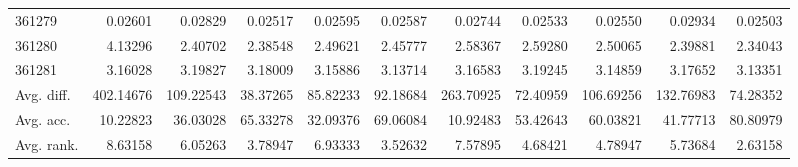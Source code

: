 \begin{tabular}{lrrrrrrrrrr}
361279 & 0.02601 & 0.02829 & 0.02517 & 0.02595 & 0.02587 & 0.02744 & 0.02533 & 0.02550 & 0.02934 & 0.02503 \\
361280 & 4.13296 & 2.40702 & 2.38548 & 2.49621 & 2.45777 & 2.58367 & 2.59280 & 2.50065 & 2.39881 & 2.34043 \\
361281 & 3.16028 & 3.19827 & 3.18009 & 3.15886 & 3.13714 & 3.16583 & 3.19245 & 3.14859 & 3.17652 & 3.13351 \\
Avg. diff. & 402.14676 & 109.22543 & 38.37265 & 85.82233 & 92.18684 & 263.70925 & 72.40959 & 106.69256 & 132.76983 & 74.28352 \\
Avg. acc. & 10.22823 & 36.03028 & 65.33278 & 32.09376 & 69.06084 & 10.92483 & 53.42643 & 60.03821 & 41.77713 & 80.80979 \\
Avg. rank. & 8.63158 & 6.05263 & 3.78947 & 6.93333 & 3.52632 & 7.57895 & 4.68421 & 4.78947 & 5.73684 & 2.63158 \\
\bottomrule
\end{tabular}
